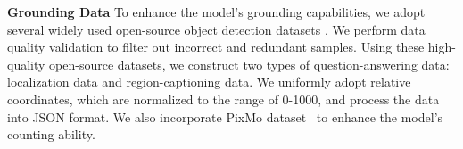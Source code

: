\documentclass{article}
\begin{document}




\textbf{Grounding Data}
To enhance the model’s grounding capabilities, we adopt several widely used open-source object detection datasets \citep{krishna2017visualgenome,mao2016refcocoplusg,lin2014microsoftcoco,shao2019objects365}. We perform data quality validation to filter out incorrect and redundant samples. Using these high-quality open-source datasets, we construct two types of question-answering data: localization data and region-captioning data. We uniformly adopt relative coordinates, which are normalized to the range of 0-1000, and process the data into JSON format. We also incorporate PixMo dataset~\citep{deitke2024molmo} to enhance the model’s counting ability.
\end{document}
